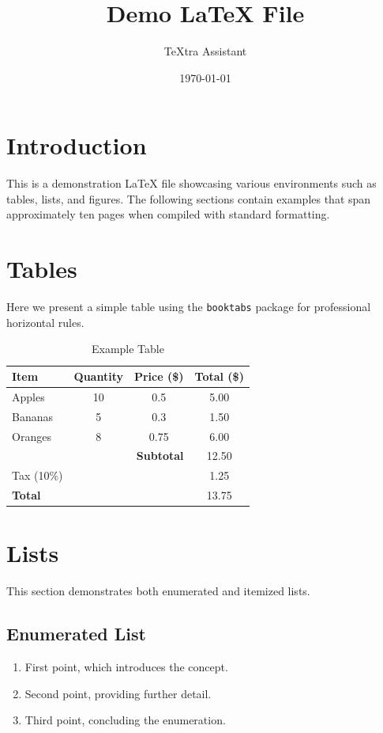\documentclass{article}
\title{Demo LaTeX File}
\author{TeXtra Assistant}
\date{\today}
\begin{document}
\maketitle

\section{Introduction}
This is a demonstration LaTeX file showcasing various environments such as tables, lists, and figures. The following sections contain examples that span approximately ten pages when compiled with standard formatting.

\lipsum[1-3]

\section{Tables}
Here we present a simple table using the \texttt{booktabs} package for professional horizontal rules.

\begin{table}[htbp]
\centering
\caption{Example Table}
\label{tab:example}
\begin{tabular}{lccc}
\toprule
\textbf{Item} & \textbf{Quantity} & \textbf{Price (\$)} & \textbf{Total (\$)} \\
\midrule
Apples & 10 & 0.5 & 5.00 \\
Bananas & 5 & 0.3 & 1.50 \\
Oranges & 8 & 0.75 & 6.00 \\
\midrule
\multicolumn{3}{r}{\textbf{Subtotal}} & 12.50 \\
Tax (10\%) & & & 1.25 \\
\hline
\textbf{Total} & & & 13.75 \\
\bottomrule
\end{tabular}
\end{table}

\lipsum[4-6]

\section{Lists}
This section demonstrates both enumerated and itemized lists.

\subsection{Enumerated List}
\begin{enumerate}[label=\arabic*.]
\item First point, which introduces the concept.
\item Second point, providing further detail.
\item Third point, concluding the enumeration.
\end{enumerate}
\end{document}
